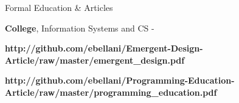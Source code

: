 \begin{rubric}{Formal Education \& Articles}

    \entry*[2002 -- 2007] \textbf{College}, Information Systems and CS -

    \entry*
    \textbf{}

    \entry*
    \textbf{
    {http://github.com/ebellani/Emergent-Design-Article/raw/master/emergent_design.pdf}} 
    
    \entry*
    \textbf{
    {http://github.com/ebellani/Programming-Education-Article/raw/master/programming_education.pdf}} 

\end{rubric}
